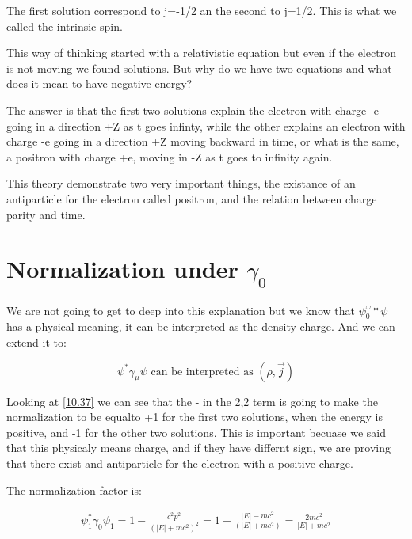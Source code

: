 The first solution correspond to j=-1/2 an the second to j=1/2. This is what we called the intrinsic spin.


This way of thinking started with a relativistic equation but even if the electron is not moving we found solutions. But why do we have two equations and what does it mean to have negative energy?

The answer is that the first two solutions explain the electron with charge -e going in a direction +Z as t goes infinty, while the other explains an electron with charge -e going in a direction +Z moving backward in time, or what is the same, a positron with charge +e, moving in -Z as t goes to infinity again.

This theory demonstrate two very important things, the existance of an antiparticle for the electron called positron, and the relation between charge parity and time.

\section{Normalization under $\gamma_0$}

We are not going to get to deep into this explanation but we know that $\psi^\omega_0*\psi$ has a physical meaning, it can be interpreted as the density charge. And we can extend it to:

\begin{equation}
  \psi^*\gamma_\mu \psi \text{ can be interpreted as } (\rho,\vec{j})
\end{equation}

Looking at \ref{10.37} we can see that the - in the 2,2 term is going to make the normalization to be equalto +1 for the first two solutions, when the energy is positive, and -1 for the other two solutions. This is important becuase we said that this physicaly means charge, and if they have differnt sign, we are proving that there exist and antiparticle for the electron with a positive charge.

The normalization factor is:

\begin{equation}
  \begin{array}{c}
    \psi_1^*\gamma_0\psi_1 = 1-\frac{c^2p^2}{(|E|+mc^2)^2} = 1-\frac{|E|-mc^2}{(|E|+mc^2)} = \frac{2mc^2}{|E|+mc^2}
  \end{array}
\end{equation}

